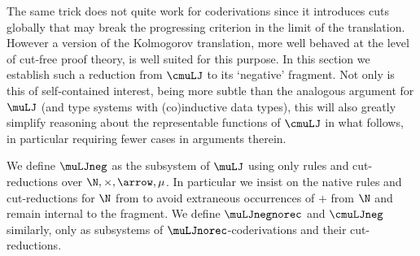 The same trick does not quite work for coderivations since it introduces cuts globally that may break the progressing criterion in the limit of the translation.
However a version of the Kolmogorov translation, more well behaved at the level of cut-free proof theory, is well suited for this purpose.
% 
In this section we establish such a reduction from $\cmuLJ$ to its `negative' fragment.
Not only is this of self-contained interest, being more subtle than the analogous argument for $\muLJ$ (and type systems with (co)inductive data types), this will also greatly simplify reasoning about the representable functions of $\cmuLJ$ in what follows, in particular requiring fewer cases in arguments therein.



\begin{defn} \label{defn:negative-fragments}
We define $\muLJneg$ as the subsystem of $\muLJ$ using only rules and cut-reductions over $\N, \times, \arrow, \mu$.
In particular we insist on the native rules and cut-reductions for $\N$ from  to avoid extraneous occurrences of $+$ from $\N$ and remain internal to the fragment.
We define $\muLJnegnorec$ and $\cmuLJneg$ similarly, only as subsystems of $\muLJnorec$-coderivations and their cut-reductions.
\end{defn}



